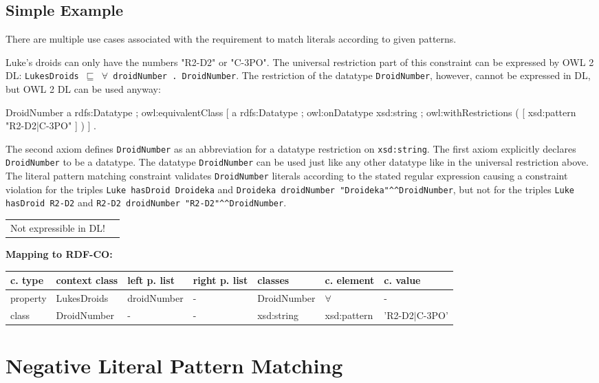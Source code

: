 \documentclass{llncs}
\newcommand{\ms}[1]{\texttt{#1}}
\newenvironment{gcotable}{
  \scriptsize
  \sffamily
  \vspace{0cm}
	\begin{center}
	\textbf{\vspace{0.4cm}Mapping to RDF-CO:} \\
  \begin{tabular}{l|l|l|l|l|l|l}
	\hline
  \textbf{c. type} & \textbf{context class} & \textbf{left p. list} & \textbf{right p. list} & \textbf{classes} & \textbf{c. element} & \textbf{c. value} \\
  \hline

}{
  \hline
  \end{tabular}
	\end{center}
}
\newenvironment{DL}{
  \vspace{0cm}
	\begin{center}
  \begin{tabular}{r l}

}{
  \end{tabular}
	\end{center}
}
\begin{document}
\subsection{Simple Example}

There are multiple use cases associated with the requirement to match literals according to given patterns.

Luke's droids can only have the numbers "R2-D2" or "C-3PO".
The universal restriction part of this constraint can be expressed by OWL 2 DL:
\ms{LukesDroids $\sqsubseteq$ $\forall$ droidNumber . DroidNumber}.
The restriction of the datatype \ms{DroidNumber}, however, cannot be expressed in DL, but OWL 2 DL can be used anyway:

\begin{ex}
DroidNumber 
    a rdfs:Datatype ;
    owl:equivalentClass [
        a rdfs:Datatype ;
        owl:onDatatype xsd:string ;
        owl:withRestrictions ( 
            [ xsd:pattern "R2-D2|C-3PO" ] ) ] .
\end{ex}

The second axiom defines \ms{DroidNumber} as an abbreviation for a datatype restriction on \ms{xsd:string}. 
The first axiom explicitly declares \ms{DroidNumber} to be a datatype. 
The datatype \ms{DroidNumber} can be used just like any other datatype like in the universal restriction above.
The literal pattern matching constraint validates \ms{DroidNumber} literals according to the stated regular expression causing a constraint violation for the triples 
\ms{Luke hasDroid Droideka} and \ms{Droideka droidNumber "Droideka"\textasciicircum{}\textasciicircum{}DroidNumber}, 
but not for the triples \ms{Luke hasDroid R2-D2} and \ms{R2-D2 droidNumber "R2-D2"\textasciicircum{}\textasciicircum{}DroidNumber}.

\begin{DL}
Not expressible in DL!
\end{DL}

\begin{gcotable}
property & LukesDroids & droidNumber & - & DroidNumber & $\forall$ & - \\
class & DroidNumber & - & - & xsd:string & xsd:pattern & 'R2-D2$|$C-3PO' \\
\end{gcotable}

\section{Negative Literal Pattern Matching}
\end{document}
